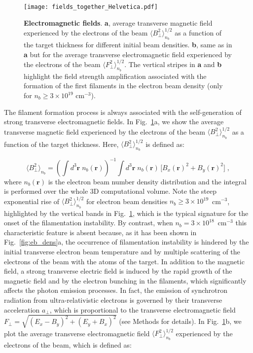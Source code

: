 \documentclass[fleqn,11pt]{wlscirep}
\begin{document}
\begin{figure} %
\centering
\texttt{[image: fields\_together\_Helvetica.pdf]}
\caption{{\bf Electromagnetic fields}. \textbf{a}, average transverse magnetic field experienced by the electrons of the beam $\langle B_\perp^2\rangle_{n_b}^{1/2}$ as a function of the target thickness for different initial beam densities. 
\textbf{b}, same as in \textbf{a} but for the average transverse electromagnetic field experienced by the electrons of the beam $\langle F_\perp^2\rangle_{n_b}^{1/2}$.  
The vertical stripes in \textbf{a} and \textbf{b} highlight the field strength amplification associated with the formation of the first filaments in the electron beam density (only for $n_b\geq3\times10^{19}$ cm$^{-3}$).}
\label{fig:BperpFperp}
\end{figure}

The filament formation process is always associated with the self-generation of strong transverse electromagnetic fields. 
In Fig.~\ref{fig:BperpFperp}a, we show the average transverse magnetic field experienced by the electrons of the beam $\langle B_\perp^2\rangle_{n_b}^{1/2}$ as a function of the target thickness. Here, $\langle B_\perp^2\rangle_{n_b}^{1/2}$ is defined as:

\begin{equation}
\langle B_\perp^2\rangle_{n_b}=\left(\int d^3\boldsymbol{r} \;n_b(\boldsymbol{r})\right)^{-1}
\displaystyle \int d^3\boldsymbol{r} \;n_b(\boldsymbol{r}) \,\Big[B_x(\boldsymbol{r})^2+B_y(\boldsymbol{r})^2\Big]\;,\label{Bperp_ave_nb}
\end{equation}
where $n_b(\boldsymbol{r})$ is the electron beam number density distribution and the integral is performed over the whole 3D computational volume. Note the steep exponential rise of $\langle B_\perp^2\rangle_{n_b}^{1/2}$ for electron beam densities $n_b\geq3\times10^{19}$~cm$^{-3}$, highlighted by the vertical bands in Fig.~\ref{fig:BperpFperp}, which is the typical signature for the onset of the filamentation instability\cite{AW2}. 
By contrast, when $n_b=3\times10^{18}$~cm$^{-3}$ this characteristic feature is absent because, as it has been shown in Fig.~\ref{fig:eb_dens}a, the occurrence of filamentation instability is hindered by the initial transverse electron beam temperature and by multiple scattering of the electrons of the beam with the atoms of the target. 
In addition to the magnetic field, a strong transverse electric field is induced by the rapid growth of the magnetic field and by the electron bunching in the filaments, which significantly affects the photon emission processes. In fact, the emission of synchrotron radiation from ultra-relativistic electrons is governed by their transverse acceleration\cite{BaierBook} $a_\perp$, which is proportional to the transverse electromagnetic field $F_\perp=\sqrt{(E_x-B_y)^2+(E_y+B_x)^2}$ (see Methods for details). In Fig.~\ref{fig:BperpFperp}b, we plot the average transverse electromagnetic field $\langle F_\perp^2\rangle_{n_b}^{1/2}$ experienced by the electrons of the beam, which is defined as:
\end{document}
